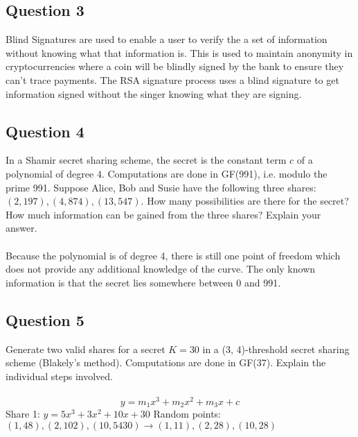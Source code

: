 \documentclass[12pt, a4paper]{report}
\begin{document}
\begin{multicols*}{2}
\subsection{Question 3}
Blind Signatures are used to enable a user to verify the a set of information without knowing what that information is. This is used to maintain anonymity in cryptocurrencies where a coin will be blindly signed by the bank to ensure they can't trace payments. The RSA signature process uses a blind signature to get information signed without the singer knowing what they are signing.

\subsection{Question 4}
In a Shamir secret sharing scheme, the secret is the constant term $c$ of a polynomial of degree $4$. Computations are done in GF(991), i.e. modulo the prime 991. Suppose Alice, Bob and Susie have the following three shares: $(2,197),(4,874),(13,547)$. How many possibilities are there for the secret? How much information can be gained from the three shares? Explain your answer.\\\\

Because the polynomial is of degree 4, there is still one point of freedom which does not provide any additional knowledge of the curve. The only known information is that the secret lies somewhere between 0 and 991.

\subsection{Question 5}
Generate two valid shares for a secret $K=30$ in a (3, 4)-threshold secret sharing scheme (Blakely's method). Computations are done in GF(37). Explain the individual steps involved.\\\\

$$ y = m_1x^3 + m_2x^2 + m_3x + c$$
Share 1: $y = 5x^3 + 3x^2 + 10x + 30$
Random points: $(1,48), (2, 102), (10, 5430) \rightarrow (1, 11), (2, 28), (10, 28)$


\end{multicols*}
\end{document}
